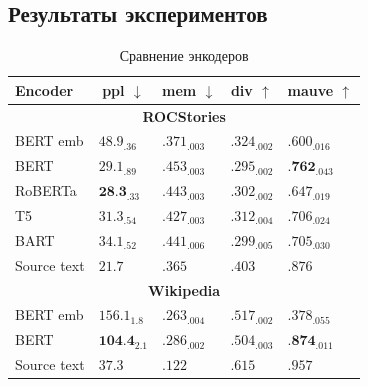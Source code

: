 \documentclass[a4paper, 12pt]{article}
\begin{document}
\subsection{Результаты экспериментов}

\begin{table}
\centering
\begin{tabular}{l|llll}
\hline
\multicolumn{1}{l|}{\textbf{Encoder}}
    & \multicolumn{1}{c}{\textbf{ppl} $\downarrow$} 
    & \multicolumn{1}{c}{\textbf{mem} $\downarrow$}
    & \multicolumn{1}{c}{\textbf{div} $\uparrow$}
    & \multicolumn{1}{c}{\textbf{mauve} $\uparrow$}\\
\hline
\multicolumn{5}{c}{\textbf{ROCStories}} \\
\hline
BERT emb & $48.9_{.36}$ & $.371_{.003}$ & $.324_{.002}$ & $.600_{.016}$ \\
BERT & $29.1_{.89}$ & ${.453}_{.003}$ & ${.295}_{.002}$ & $\textbf{.762}_{.043}$ \\
RoBERTa & $\textbf{28.3}_{.33}$ & ${.443}_{.003}$ & ${.302}_{.002}$ & ${.647}_{.019}$\\
T5 & ${31.3}_{.54}$ & $.427_{.003}$ & $.312_{.004}$ & $.706_{.024}$ \\
BART & $34.1_{.52}$ & $.441_{.006}$ & $.299_{.005}$ & $.705_{.030}$\\
\hline
Source text & $21.7$ & $.365$ & $.403$ & $.876$ \\
\hline
\multicolumn{5}{c}{\textbf{Wikipedia}} \\
\hline
BERT emb & $156.1_{1.8}$ & $.263_{.004}$ & $.517_{.002}$ & $.378_{.055}$ \\
BERT & $\textbf{104.4}_{2.1}$ & $.286_{.002}$ & $.504_{.003}$ & $\textbf{.874}_{.011}$ \\
\hline
Source text & $37.3$ & $.122$ & $.615$ & $.957$ \\
\hline
\end{tabular}
\caption{Сравнение энкодеров}
\label{tab::encoders}
\end{table}
\end{document}
